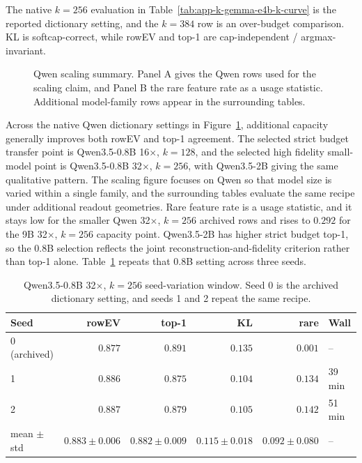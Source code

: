 The native $k=256$ evaluation in Table~\ref{tab:app-k-gemma-e4b-k-curve} is
the reported dictionary setting, and the $k=384$ row
is an over-budget comparison. KL is softcap-correct, while rowEV and top-1 are
cap-independent / argmax-invariant.

\begin{figure}[!tbp]
    \centering
    \caption{
        Qwen scaling summary. Panel A gives the Qwen rows used for the scaling
        claim, and Panel B the rare feature rate as a usage statistic. Additional
        model-family rows appear in the surrounding tables.
    }
    \label{fig:app-k-cross-model-scaling}
\end{figure}

\ReadoutSAEFloatBarrier

Across the native Qwen dictionary settings in
Figure~\ref{fig:app-k-cross-model-scaling}, additional capacity generally improves
both rowEV and top-1 agreement. The selected strict budget transfer point is
Qwen3.5-0.8B 16$\times$, $k=128$, and the selected high fidelity
small-model point is Qwen3.5-0.8B 32$\times$, $k=256$, with Qwen3.5-2B giving
the same qualitative pattern. The scaling figure focuses on Qwen so that model
size is varied within a single family, and the surrounding tables evaluate the same
recipe under additional readout geometries. Rare feature rate is a
usage statistic, and it stays low for
the smaller Qwen 32$\times$, $k=256$ archived rows and rises to $0.292$ for the 9B
32$\times$, $k=256$ capacity point.
Qwen3.5-2B has higher strict budget top-1, so the 0.8B selection reflects
the joint reconstruction-and-fidelity criterion rather than top-1 alone.
Table~\ref{tab:app-k-qwen08b-seed-window} repeats that 0.8B setting across
three seeds.

\begin{table}[!tbp]
\caption{Qwen3.5-0.8B 32$\times$, $k=256$ seed-variation window. Seed 0 is the
archived dictionary setting, and seeds 1 and 2 repeat the same recipe.}
\label{tab:app-k-qwen08b-seed-window}
\centering
\scriptsize
\setlength{\tabcolsep}{4pt}
\renewcommand{\arraystretch}{1.08}
\begin{tabular}{@{}lrrrrl@{}}
\toprule
Seed & rowEV & top-1 & KL & rare & Wall \\
\midrule
0 (archived) & $0.877$ & $0.891$ & $0.135$ & $0.001$ & -- \\
1 & $0.886$ & $0.875$ & $0.104$ & $0.134$ & 39 min \\
2 & $0.887$ & $0.879$ & $0.105$ & $0.142$ & 51 min \\
\midrule
mean $\pm$ std & $0.883 \pm 0.006$ & $0.882 \pm 0.009$ &
$0.115 \pm 0.018$ & $0.092 \pm 0.080$ & -- \\
\bottomrule
\end{tabular}
\end{table}

